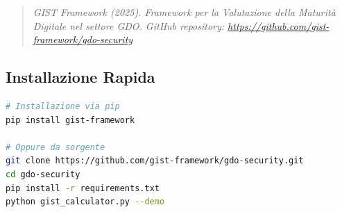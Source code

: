 \begin{quote}
\small
\textit{GIST Framework (2025). Framework per la Valutazione della Maturità Digitale nel settore GDO. GitHub repository: \url{https://github.com/gist-framework/gdo-security}}
\end{quote}

\subsection*{Installazione Rapida}

\begin{lstlisting}[language=bash, basicstyle=\small\ttfamily]
# Installazione via pip
pip install gist-framework

# Oppure da sorgente
git clone https://github.com/gist-framework/gdo-security.git
cd gdo-security
pip install -r requirements.txt
python gist_calculator.py --demo
\end{lstlisting}